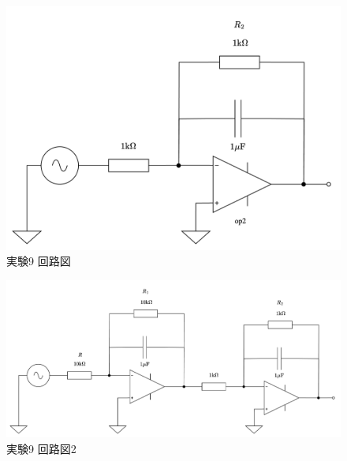 \begin{figure}[!htb]
	\centering
	\includegraphics[width=0.9\linewidth]{src/figures/exp9/circuit.png}
	\caption{実験9 回路図}\label{fig:exp9-circuit}
\end{figure}

\begin{figure}[!htb]
	\centering
	\includegraphics[width=0.9\linewidth]{src/figures/exp9/circuit2.png}
	\caption{実験9 回路図2}\label{fig:exp9-circuit2}
\end{figure}
